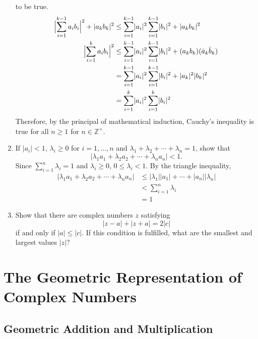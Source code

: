 \begin{enumerate}
\[  \]
  to be true.
  \begin{align*}
    \Bigl\lvert\sum_{i = 1}^{k - 1}a_ib_i\Bigr\rvert^2 + \lvert a_kb_k\rvert^2
    & \leq \sum_{i = 1}^{k - 1}\lvert a_i\rvert^2
      \sum_{i = 1}^{k - 1}\lvert b_i\rvert^2 + \lvert a_kb_k\rvert^2\\
    \Bigl\lvert\sum_{i = 1}^ka_ib_i\Bigr\rvert^2
    & \leq \sum_{i = 1}^{k - 1}\lvert a_i\rvert^2
      \sum_{i = 1}^{k - 1}\lvert b_i\rvert^2 + (a_kb_k)(\bar{a}_k\bar{b}_k)\\
    & = \sum_{i = 1}^{k - 1}\lvert a_i\rvert^2
      \sum_{i = 1}^{k - 1}\lvert b_i\rvert^2 + \lvert a_k\rvert^2
      \lvert b_k\rvert^2\\
    & = \sum_{i = 1}^k\lvert a_i\rvert^2\sum_{i = 1}^k\lvert b_i\rvert^2
  \end{align*}
  Therefore, by the principal of mathematical induction, Cauchy's inequality is
  true for all \(n\geq 1\) for \(n\in\mathbb{Z}^+\).
\item
  If \(\lvert a_i\rvert < 1\), \(\lambda_i\geq 0\) for \(i = 1,\ldots,n\) and
  \(\lambda_1 + \lambda_2 + \cdots + \lambda_n = 1\), show that
  \[
  \lvert\lambda_1a_1 + \lambda_2a_2 + \cdots + \lambda_na_n\rvert < 1.
  \]
  Since \(\sum_{i = 1}^n\lambda_i = 1\) and \(\lambda_i\geq 0\),
  \(0\leq \lambda_i < 1\).
  By the triangle inequality,
  \begin{align*}
    \lvert\lambda_1a_1 + \lambda_2a_2 + \cdots + \lambda_na_n\rvert
    & \leq\lvert\lambda_1\rvert\lvert a_1\rvert + \cdots +
      \lvert a_n\rvert\lvert\lambda_n\rvert\\
    & < \sum_{i = 1}^n\lambda_i\\
    & = 1
  \end{align*}
\item
  Show that there are complex numbers \(z\) satisfying
  \[
  \lvert z - a\rvert + \lvert z + a\rvert = 2\lvert c\rvert
  \]
  if and only if \(\lvert a\rvert\leq\lvert c\rvert\).
  If this condition is fulfilled, what are the smallest and largest values
  \(\lvert z\rvert\)?
\end{enumerate}

\section{The Geometric Representation of Complex Numbers}

\subsection{Geometric Addition and Multiplication}

